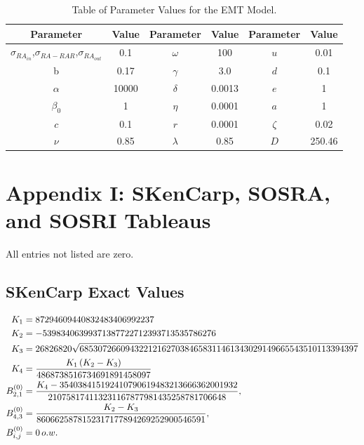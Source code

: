 \documentclass{article}
\begin{document}
\begin{table}
	\centering{}{\footnotesize{} }%
	\begin{tabular}{|c|c|c|c|c|c|}
		\hline
		{\footnotesize{}Parameter } & {\footnotesize{}Value } & {\footnotesize{}Parameter } & {\footnotesize{}Value } & {\footnotesize{}Parameter } & {\footnotesize{}Value }\tabularnewline
		\hline
		\hline
		$\sigma_{RA_{in}}$,$\sigma_{RA-RAR}$,$\sigma_{RA_{out}}$ & 0.1 & $\omega$ & 100 & $u$ & 0.01\tabularnewline
		\hline
		b & 0.17 & $\gamma$ & 3.0 & $d$ & 0.1\tabularnewline
		\hline
		$\alpha$ & 10000  & $\delta$ & 0.0013  & $e$ & 1\tabularnewline
		\hline
		$\beta_{0}$ & 1 & $\eta$ & 0.0001  & $a$ & 1\tabularnewline
		\hline
		$c$ & 0.1 & $r$ & 0.0001  & $\zeta$ & 0.02\tabularnewline
		\hline
		$\nu$ & 0.85 & $\lambda$ & 0.85 & $D$ & 250.46\tabularnewline
		\hline
	\end{tabular} \caption{Table of Parameter Values for the EMT Model.\label{tab:params2}}
\end{table}

\section{Appendix I: SKenCarp, SOSRA, and SOSRI Tableaus}

All entries not listed are zero.

\subsection{SKenCarp Exact Values\label{subsec:SKenCarpExact}}

{\small
\begin{align*}
	K_1 & = 87294609440832483406992237 \\
	K_2 & = -53983406399371387722712393713535786276 \\
	K_3 & = 26826820\sqrt{6853072660943221216270384658311461343029149665543510113394397} \\
	K_4 & =\frac{K_1\left(K_2-K_3\right)}{4868738516734691891458097}\\
	B_{2,1}^{(0)} & =\frac{K_4-354038415192410790619483213666362001932}{210758174113231167877981435258781706648},\\
	B_{4,3}^{(0)} & =\frac{K_2-K_3}{8606625878152317177894269252900546591},\\
	B_{i,j}^{(0)} & =0\thinspace o.w.
\end{align*}
}%
\end{document}

